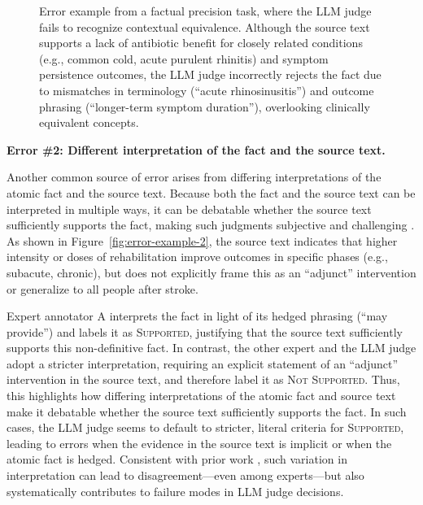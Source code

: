 \documentclass{article}
\newcommand{\xhdr}[1]{%
  \noindent\textbf{#1.}
}
\begin{document}
\begin{figure}[h!]
\begin{small}
\begin{tcolorbox}[colback=gray!5, colframe=red, width=\textwidth]
\begin{enumerate}[leftmargin=0.6cm]
\end{enumerate}
\end{tcolorbox}
\caption{Error example from a factual precision task, where the LLM judge fails to recognize contextual equivalence. Although the source text supports a lack of antibiotic benefit for closely related conditions (e.g., common cold, acute purulent rhinitis) and symptom persistence outcomes, the LLM judge incorrectly rejects the fact due to mismatches in terminology (``acute rhinosinusitis'') and outcome phrasing (``longer-term symptom duration''), overlooking clinically equivalent concepts.} 
\label{fig:error-example-1}
\end{small}
\end{figure}


\xhdr{Error \#2: Different interpretation of the fact and the source text}

Another common source of error arises from differing interpretations of the atomic fact and the source text. Because both the fact and the source text can be interpreted in multiple ways, it can be debatable whether the source text sufficiently supports the fact, making such judgments subjective and challenging \cite{min-etal-2023-factscore}. As shown in Figure~\ref{fig:error-example-2}, the source text indicates that higher intensity or doses of rehabilitation improve outcomes in specific phases (e.g., subacute, chronic), but does not explicitly frame this as an ``adjunct'' intervention or generalize to all people after stroke. 

Expert annotator A interprets the fact in light of its hedged phrasing (``may provide'') and labels it as \textsc{Supported}, justifying that the source text sufficiently supports this non-definitive fact. In contrast, the other expert and the LLM judge adopt a stricter interpretation, requiring an explicit statement of an ``adjunct'' intervention in the source text, and therefore label it as \textsc{Not Supported}. Thus, this highlights how differing interpretations of the atomic fact and source text make it debatable whether the source text sufficiently supports the fact. In such cases, the LLM judge seems to default to stricter, literal criteria for \textsc{Supported}, leading to errors when the evidence in the source text is implicit or when the atomic fact is hedged. Consistent with prior work \cite{hwang2026deepresearchshallowevaluation}, such variation in interpretation can lead to disagreement---even among experts---but also systematically contributes to failure modes in LLM judge decisions.
\end{document}
